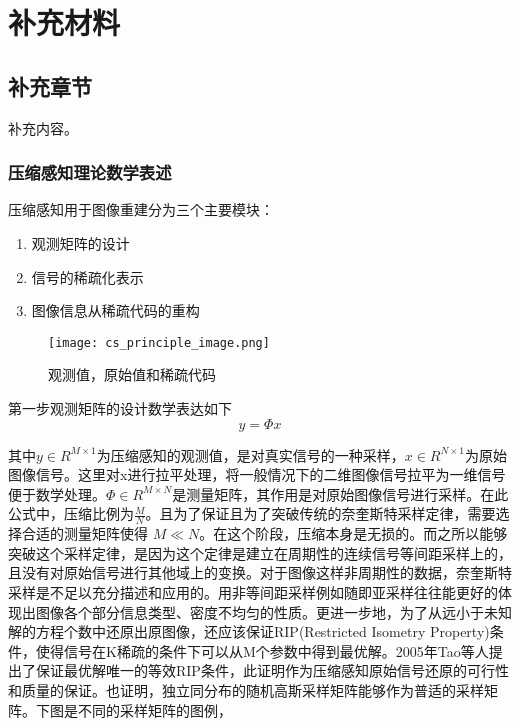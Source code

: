 
\chapter{补充材料}


\section{补充章节}

补充内容。
\subsection{压缩感知理论数学表述}
压缩感知用于图像重建分为三个主要模块：
\begin{enumerate}
  \item 观测矩阵的设计
  \item 信号的稀疏化表示
  \item 图像信息从稀疏代码的重构
\end{enumerate}

\begin{figure}[ht]
  \centering
  \texttt{[image: cs\_principle\_image.png]}
  \caption{观测值，原始值和稀疏代码}

\end{figure}
第一步观测矩阵的设计数学表达如下
\begin{equation}
  \label{eq:9}
  y = \Phi x
\end{equation}

其中$y \in R^{M \times 1}$为压缩感知的观测值，是对真实信号的一种采样，$x \in R^{N \times 1}$为原始图像信号。这里对x进行拉平处理，将一般情况下的二维图像信号拉平为一维信号便于数学处理。$\Phi \in R^{M \times N}$是测量矩阵，其作用是对原始图像信号进行采样。在此公式中，压缩比例为$\frac{M}{N}$。且为了保证且为了突破传统的奈奎斯特采样定律，需要选择合适的测量矩阵使得 $M \ll N$。在这个阶段，压缩本身是无损的。而之所以能够突破这个采样定律，是因为这个定律是建立在周期性的连续信号等间距采样上的，且没有对原始信号进行其他域上的变换。对于图像这样非周期性的数据，奈奎斯特采样是不足以充分描述和应用的。用非等间距采样例如随即亚采样往往能更好的体现出图像各个部分信息类型、密度不均匀的性质。更进一步地，为了从远小于未知解的方程个数中还原出原图像，还应该保证RIP(Restricted Isometry Property)条件，使得信号在K稀疏的条件下可以从M个参数中得到最优解。2005年Tao等人\cite{Decoding_by_linear_programming}提出了保证最优解唯一的等效RIP条件，此证明作为压缩感知原始信号还原的可行性和质量的保证。也证明，独立同分布的随机高斯采样矩阵能够作为普适的采样矩阵。下图是不同的采样矩阵的图例，

